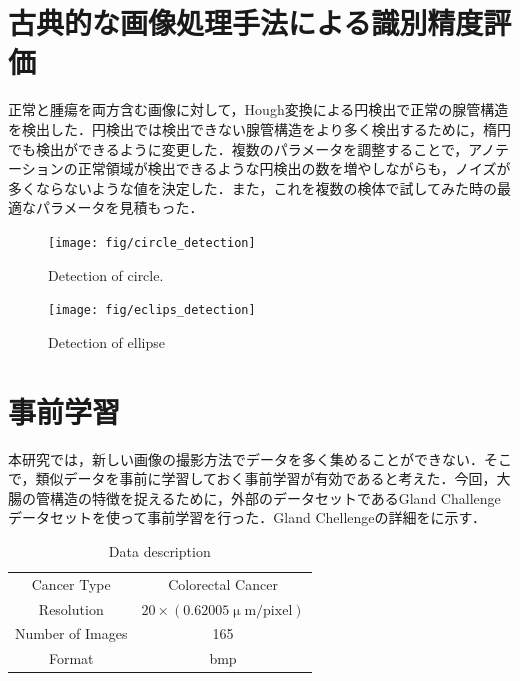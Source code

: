 \section{古典的な画像処理手法による識別精度評価}
正常と腫瘍を両方含む画像に対して，Hough変換による円検出で正常の腺管構造を検出した．円検出では検出できない腺管構造をより多く検出するために，楕円でも検出ができるように変更した．複数のパラメータを調整することで，アノテーションの正常領域が検出できるような円検出の数を増やしながらも，ノイズが多くならないような値を決定した．また，これを複数の検体で試してみた時の最適なパラメータを見積もった．

\begin{figure}[H]
	\centering
	\texttt{[image: fig/circle\_detection]}
	\caption{Detection of circle.}
	\label{fig:circle_detection}
\end{figure}

\begin{figure}[H]
	\centering
	\texttt{[image: fig/eclips\_detection]}
	\caption{Detection of ellipse}
	\label{fig:ellipse_detection}
\end{figure}


\section{事前学習}
本研究では，新しい画像の撮影方法でデータを多く集めることができない．そこで，類似データを事前に学習しておく事前学習が有効であると考えた．今回，大腸の管構造の特徴を捉えるために，外部のデータセットであるGland Challengeデータセットを使って事前学習を行った．Gland Chellengeの詳細をに示す．

\begin{table}[H]
	\centering
	\caption{Data description}
	\label{tab:GlandChallenge}
	\begin{tabular}{cc}\toprule
		Cancer Type & Colorectal Cancer \\ 
		Resolution & $20\times (0.62005 \upmu \mathrm{m / pixel})$ \\ 
		Number of Images & 165 \\ 
		Format & bmp \\ \bottomrule
	\end{tabular} 
\end{table}


